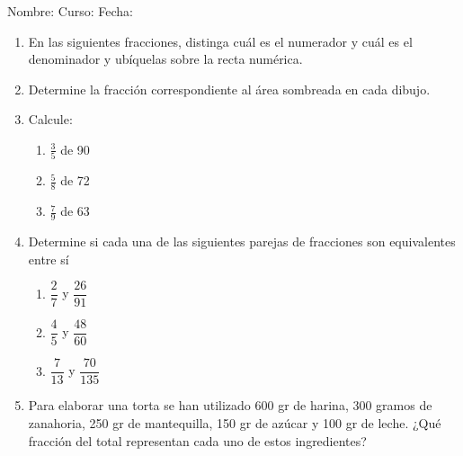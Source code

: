 \documentclass[fleqn]{article}
\newcommand{\LineaNombre}{%
\par
\vspace{\baselineskip}
Nombre:\hrulefill \; Curso: \underline{\hspace*{48pt}} \; Fecha: \underline{\hspace*{2.5cm}} \relax
\par}
\begin{document}
\LineaNombre
\begin{enumerate}
 \item En las siguientes fracciones, distinga cuál es el numerador y cuál es el denominador y ubíquelas sobre la recta numérica.
 \begin{enumerate}
 \end{enumerate}
 \item Determine la fracción correspondiente al área sombreada en cada dibujo.
 
 \item Calcule:
 \begin{enumerate}
 \item $\frac{3}{5}$ de 90 \noanswer
 \item $\frac{5}{8}$ de 72 \noanswer
 \item $\frac{7}{9}$ de 63 \noanswer
 \end{enumerate}
 \newpage
 \item Determine si cada una de las siguientes parejas de fracciones son equivalentes entre sí
 \begin{enumerate}
 \item $\dfrac{2}{7}$ y $\dfrac{26}{91}$ \noanswer[.5in]
 \item $\dfrac{4}{5}$ y $\dfrac{48}{60}$ \noanswer[.5in]
 \item $\dfrac{7}{13}$ y $\dfrac{70}{135}$ \noanswer[.5in]
 \end{enumerate}
 \item Para elaborar una torta se han utilizado 600 gr de harina, 300 gramos de zanahoria, 250 gr de mantequilla, 150 gr de azúcar y 100 gr de leche. ¿Qué fracción del total representan cada uno de estos ingredientes?\noanswer
 \end{enumerate}
\end{document}
